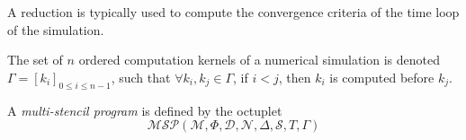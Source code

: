 
A reduction is typically used to compute the convergence criteria of the time loop of the simulation. %


\begin{mydef}
The set of $n$ ordered computation kernels of a numerical simulation is denoted $\Gamma = [k_i]_{0 \leq i \leq n-1}$, such that $\forall k_i,k_j \in \Gamma$, if $i < j$, then $k_i$ is computed before $k_j$.
\end{mydef}

\begin{mydef}
A \textit{multi-stencil program} is defined by the octuplet 
\begin{equation*}
\mathcal{MSP}(\mathcal{M},\Phi,\mathcal{D},\mathcal{N},\Delta, \mathcal{S},T,\Gamma)
\end{equation*}
\end{mydef}



